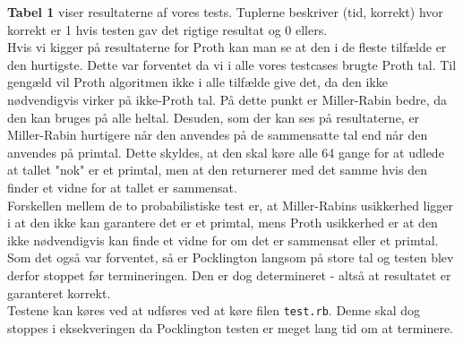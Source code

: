 \documentclass[12pt]{article}
\begin{document}
\textbf{Tabel 1} viser resultaterne af vores tests. Tuplerne beskriver (tid, korrekt) hvor korrekt er 1 hvis testen 
gav det rigtige resultat og 0 ellers.\\
Hvis vi kigger på resultaterne for Proth kan man se at den i de fleste tilfælde er den hurtigste. Dette var forventet
da vi i alle vores testcases brugte Proth tal. Til gengæld vil Proth algoritmen ikke i alle tilfælde give det, da den ikke nødvendigvis virker på ikke-Proth tal.  
På dette punkt er Miller-Rabin bedre, da den kan bruges på alle heltal. Desuden, som der kan ses på resultaterne, er Miller-Rabin hurtigere når den anvendes på de sammensatte tal end når den anvendes på primtal. Dette skyldes, at den skal køre alle 64 gange for at udlede at tallet "nok" er et primtal, men at den returnerer med det samme hvis den finder et vidne for at tallet er sammensat.\\
Forskellen mellem de to probabilistiske test er, at Miller-Rabins usikkerhed ligger i at den ikke kan garantere det er et primtal, mens Proth usikkerhed er at den ikke nødvendigvis kan finde et vidne for om det er sammensat eller et primtal.\\
Som det også var forventet, så er Pocklington langsom på store tal og testen blev derfor stoppet før termineringen. Den er dog determineret - altså at resultatet er garanteret korrekt.\\
Testene kan køres ved at udføres ved at køre filen \texttt{test.rb}. Denne skal dog stoppes i eksekveringen da Pocklington testen 
er meget lang tid om at terminere. 
\end{document}
